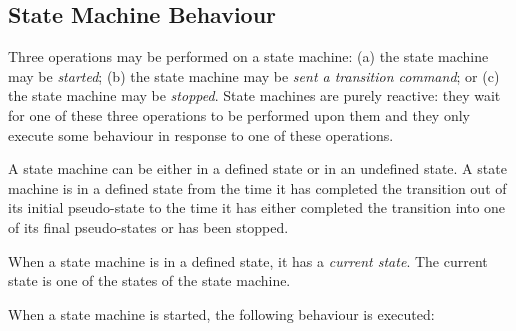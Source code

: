 \subsection{State Machine Behaviour}
Three operations may be performed on a state machine: 
(a) the state machine may be \emph{started}; 
(b) the state machine may be \emph{sent a transition command}; or 
(c) the state machine may be \emph{stopped}. 
State machines are purely reactive: they wait for one of these three operations to be performed 
upon them and they only execute some behaviour in response to one of these operations. 

A state machine can be either in a defined state or in an undefined state. 
A state machine is in a defined state from the time it has completed the 
transition out of its initial pseudo-state to the time it has either completed the transition into one of its final pseudo-states or has been stopped.

When a state machine is in a defined state, it has a \emph{current state}. The current state is one of the states of the state machine.

When a state machine is started, the following behaviour is executed:


